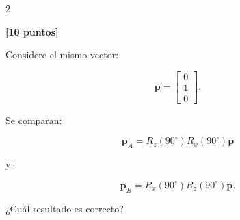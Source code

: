 \documentclass[10pt]{article}
\begin{document}
\begin{multicols}{2}



        \begin{question}
            \textbf{[10 puntos]}

            Considere el mismo vector:

            \[
            \mathbf{p}
            =
            \begin{bmatrix}
                0\\
                1\\
                0
            \end{bmatrix}.
            \]

            Se comparan:

            \[
            \mathbf{p}_A
            =
            R_z(90^\circ)R_x(90^\circ)\mathbf{p}
            \]

            y:

            \[
            \mathbf{p}_B
            =
            R_x(90^\circ)R_z(90^\circ)\mathbf{p}.
            \]

            ¿Cuál resultado es correcto?

            \begin{answers}
                \answer{
                    \[
                    \mathbf{p}_A
                    =
                    \mathbf{p}_B
                    =
                    \begin{bmatrix}
                        0\\0\\1
                    \end{bmatrix}
                    \]
                }

                \answer{
                    \[
                    \mathbf{p}_A
                    =
                    \begin{bmatrix}
                        0\\0\\1
                    \end{bmatrix},
                    \qquad
                    \mathbf{p}_B
                    =
                    \begin{bmatrix}
                        -1\\0\\0
                    \end{bmatrix}
                    \]
                }


\end{answers}
\end{question}
\end{multicols}
\end{document}
